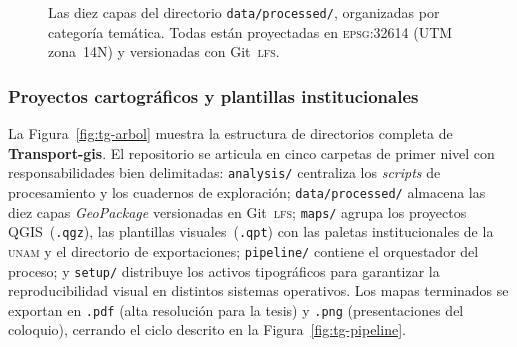 \begin{figure}[htbp]
\DIFdelendFL \DIFaddbeginFL {}
\DIFaddendFL \caption[Organización de las capas GeoPackage de Transport-gis]%
  {Las diez capas  del directorio \texttt{data/processed/}, organizadas por 
  categoría temática. Todas están proyectadas en \textsc{epsg}:32614 (UTM zona~14N) y versionadas con Git~\textsc{lfs}.}
\label{fig:tg-capas}
\end{figure}

\subsubsection{Proyectos cartográficos y plantillas institucionales}
\label{subsubsec:tg-proyectos}

La Figura~\ref{fig:tg-arbol} muestra la estructura de directorios completa de \textbf{Transport-gis}. El repositorio se articula
en cinco carpetas de primer nivel con responsabilidades bien delimitadas: \texttt{analysis/} centraliza los \textit{scripts} de
procesamiento y los cuadernos de exploración; \texttt{data/processed/} almacena las diez capas \textit{GeoPackage} versionadas en
Git~\textsc{lfs}; \texttt{maps/} agrupa los proyectos QGIS~(\texttt{.qgz}), las plantillas visuales~(\texttt{.qpt}) con las paletas
institucionales de la \textsc{unam} y el directorio de exportaciones; \texttt{pipeline/} contiene el orquestador del proceso; y
\texttt{setup/} distribuye los activos tipográficos para garantizar la reproducibilidad visual en distintos sistemas operativos.
Los mapas terminados se exportan en \texttt{.pdf} (alta resolución para la tesis) y \texttt{.png} (presentaciones del coloquio),
cerrando el ciclo descrito en la Figura~\ref{fig:tg-pipeline}.

